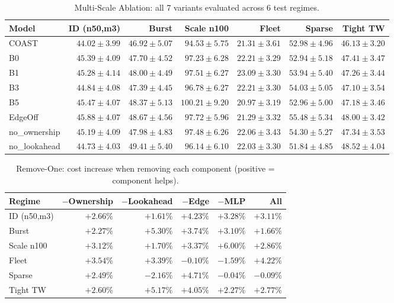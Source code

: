 \begin{table}[t]
\centering
\caption{Multi-Scale Ablation: all 7 variants evaluated across 6 test regimes.}
\label{tab:ablation_multi_scale}
\small\begin{tabular}{lrrrrrr}
\toprule
Model & ID (n50,m3) & Burst & Scale n100 & Fleet & Sparse & Tight TW \\ \midrule
COAST & $44.02\pm3.99$ & $46.92\pm5.07$ & $94.53\pm5.75$ & $21.31\pm3.61$ & $52.98\pm4.96$ & $46.13\pm3.20$ \\
B0 & $45.39\pm4.09$ & $47.70\pm4.52$ & $97.23\pm6.28$ & $22.21\pm3.29$ & $52.94\pm5.18$ & $47.41\pm3.47$ \\
B1 & $45.28\pm4.14$ & $48.00\pm4.49$ & $97.51\pm6.27$ & $23.09\pm3.30$ & $53.94\pm5.40$ & $47.26\pm3.44$ \\
B3 & $44.84\pm4.08$ & $47.39\pm4.45$ & $96.78\pm6.27$ & $22.21\pm3.30$ & $54.03\pm5.05$ & $47.10\pm3.54$ \\
B5 & $45.47\pm4.07$ & $48.37\pm5.13$ & $100.21\pm9.20$ & $20.97\pm3.19$ & $52.96\pm5.00$ & $47.18\pm3.46$ \\
EdgeOff & $45.88\pm4.07$ & $48.67\pm4.56$ & $97.72\pm5.96$ & $21.29\pm3.32$ & $55.48\pm5.34$ & $48.00\pm3.42$ \\
no_ownership & $45.19\pm4.09$ & $47.98\pm4.83$ & $97.48\pm6.26$ & $22.06\pm3.43$ & $54.30\pm5.27$ & $47.34\pm3.53$ \\
no_lookahead & $44.73\pm4.03$ & $49.41\pm5.40$ & $96.14\pm6.10$ & $22.03\pm3.30$ & $51.84\pm4.85$ & $48.52\pm4.04$ \\
\bottomrule\end{tabular}\end{table}

\begin{table}[t]
\centering
\caption{Remove-One: cost increase when removing each component (positive = component helps).}
\label{tab:remove_one}
\small\begin{tabular}{lrrrrr}
\toprule
Regime & $-$Ownership & $-$Lookahead & $-$Edge & $-$MLP & All \\ \midrule
ID (n50,m3) & $+2.66\%$ & $+1.61\%$ & $+4.23\%$ & $+3.28\%$ & $+3.11\%$ \\
Burst & $+2.27\%$ & $+5.30\%$ & $+3.74\%$ & $+3.10\%$ & $+1.66\%$ \\
Scale n100 & $+3.12\%$ & $+1.70\%$ & $+3.37\%$ & $+6.00\%$ & $+2.86\%$ \\
Fleet & $+3.54\%$ & $+3.39\%$ & $-0.10\%$ & $-1.59\%$ & $+4.22\%$ \\
Sparse & $+2.49\%$ & $-2.16\%$ & $+4.71\%$ & $-0.04\%$ & $-0.09\%$ \\
Tight TW & $+2.60\%$ & $+5.17\%$ & $+4.05\%$ & $+2.27\%$ & $+2.77\%$ \\
\bottomrule\end{tabular}\end{table}